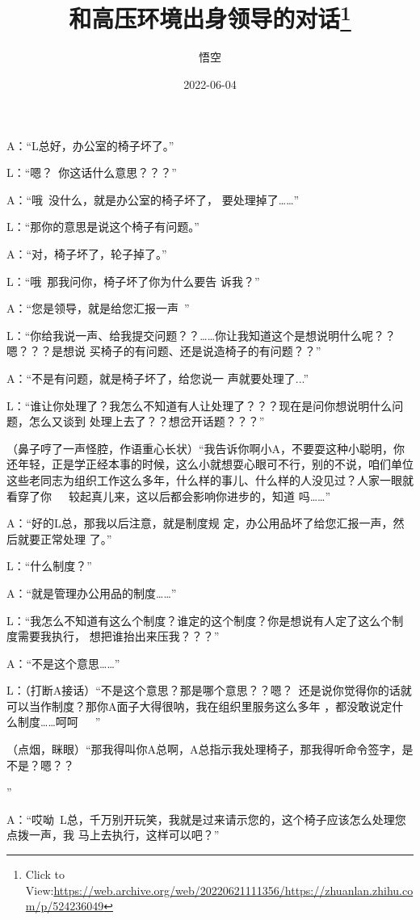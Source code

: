 \documentclass{article}
\title{和高压环境出身领导的对话\footnote{Click to View:\url{https://web.archive.org/web/20220621111356/https://zhuanlan.zhihu.com/p/524236049}}}
\author{悟空}
\date{2022-06-04}
\begin{document}

\maketitle


\Large


﻿A：“L总好，办公室的椅子坏了。” 


L：“嗯？~你这话什么意思？？？” 

A：“哦~没什么，就是办公室的椅子坏了，
要处理掉了……” 


L：“那你的意思是说这个椅子有问题。” 


A：“对，椅子坏了，轮子掉了。” 

L：“哦~那我问你，椅子坏了你为什么要告
诉我？” 


\newpage

A：“您是领导，就是给您汇报一声~” 

L：“你给我说一声、给我提交问题？？……你让我知道这个是想说明什么呢？？嗯？？？是想说
买椅子的有问题、还是说造椅子的有问题？？” 

A：“不是有问题，就是椅子坏了，给您说一
声就要处理了...” 

L：“谁让你处理了？我怎么不知道有人让处理了？？？现在是问你想说明什么问题，怎么又谈到
处理上去了？？想岔开话题？？？” 

（鼻子哼了一声怪腔，作语重心长状）“我告诉你啊小A，不要耍这种小聪明，你还年轻，正是学正经本事的时候，这么小就想耍心眼可不行，别的不说，咱们单位这些老同志为组织工作这么多年，什么样的事儿、什么样的人没见过？人家一眼就看穿了你~~~较起真儿来，这以后都会影响你进步的，知道
吗……” 

A：“好的L总，那我以后注意，就是制度规
\newpage
定，办公用品坏了给您汇报一声，然后就要正常处理
了。” 


L：“什么制度？” 


A：“就是管理办公用品的制度……” 

L：“我怎么不知道有这么个制度？谁定的这个制度？你是想说有人定了这么个制度需要我执行，
想把谁抬出来压我？？？” 


A：“不是这个意思……” 

L：（打断A接话）“不是这个意思？那是哪个意思？？嗯？~还是说你觉得你的话就可以当作制度？那你A面子大得很呐，我在组织里服务这么多年
，都没敢说定什么制度……呵呵~~~” 

（点烟，眯眼）“那我得叫你A总啊，A总指示我处理椅子，那我得听命令签字，是不是？嗯？？

\newpage
” 

A：“哎呦~L总，千万别开玩笑，我就是过来请示您的，这个椅子应该怎么处理您点拨一声，我
马上去执行，这样可以吧？” 
\end{document}
